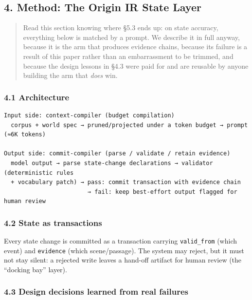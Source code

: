 \documentclass[
  english,
]{article}
\begin{document}
\subsection{4. Method: The Origin IR State
Layer}\label{method-the-origin-ir-state-layer}

\begin{quote}
Read this section knowing where §5.3 ends up: on state accuracy,
everything below is matched by a prompt. We describe it in full anyway,
because it is the arm that produces evidence chains, because its failure
is a result of this paper rather than an embarrassment to be trimmed,
and because the design lessons in §4.3 were paid for and are reusable by
anyone building the arm that \emph{does} win.
\end{quote}

\subsubsection{4.1 Architecture}\label{architecture}

\begin{verbatim}
Input side: context-compiler (budget compilation)
  corpus + world spec → pruned/projected under a token budget → prompt (≈6K tokens)

Output side: commit-compiler (parse / validate / retain evidence)
  model output → parse state-change declarations → validator (deterministic rules
  + vocabulary patch) → pass: commit transaction with evidence chain
                        → fail: keep best-effort output flagged for human review
\end{verbatim}

\subsubsection{4.2 State as transactions}\label{state-as-transactions}

Every state change is committed as a transaction carrying
\texttt{valid\_from} (which event) and \texttt{evidence} (which
scene/passage). The system may reject, but it must not stay silent: a
rejected write leaves a hand-off artifact for human review (the
``docking bay'' layer).

\subsubsection{4.3 Design decisions learned from real
failures}\label{design-decisions-learned-from-real-failures}
\end{document}
